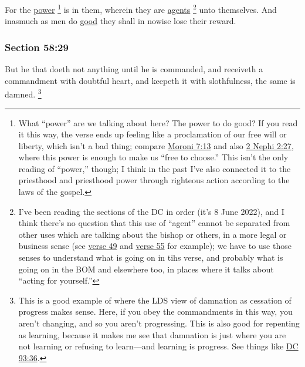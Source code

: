 		For the \hyperref[POWER]{power}%
			\footnote{%
				What ``power'' are we talking about here? The power to do good? If you read it this way, the verse ends up feeling like a proclamation of our free will or liberty, which isn't a bad thing; compare \hyperref[MORONI-7-13]{Moroni 7:13} and also \hyperref[2NEPHI-2-27]{2 Nephi 2:27}, where this power is enough to make us ``free to choose.'' This isn't the only reading of ``power,'' though; I think in the past I've also connected it to the priesthood and priesthood power through righteous action according to the laws of the gospel. 
				} 
		is in them, wherein they are \hyperref[AGENCY]{agents}%
			\footnote{%
				I've been reading the sections of the DC in order (it's 8 June 2022), and I think there's no question that this use of ``agent'' cannot be separated from other uses which are talking about the bishop or others, in a more legal or business sense (see \hyperref[DC58-49]{verse 49} and \hyperref[DC58-55]{verse 55} for example); we have to use those senses to understand what is going on in tihs verse, and probably what is going on in the BOM and elsewhere too, in places where it talks about ``acting for yourself.''
				}
		unto themselves. And inasmuch as men do \hyperref[GOODNESS]{good} they shall in nowise lose their reward.


	\subsubsection{Section 58:29} %
		\label{DC58-29}

		But he that doeth not anything until he is commanded, and receiveth a commandment with doubtful heart, and keepeth it with slothfulness, the same is damned.%
			\footnote{%
				This is a good example of where the LDS view of damnation as cessation of progress makes sense. Here, if you obey the commandments in this way, you aren't changing, and so you aren't progressing. This is also good for repenting as learning, because it makes me see that damnation is just where you are not learning or refusing to learn---and learning is progress. See things like \hyperref[DC93-36]{DC 93:36}.
				}

